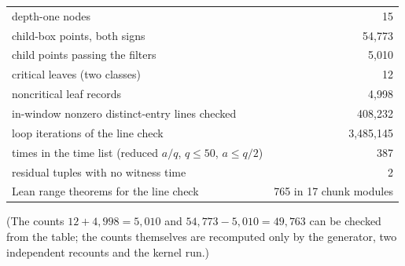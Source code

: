 \documentclass[11pt]{article}
\theoremstyle{remark}
\begin{document}
\begin{center}
\begin{tabular}{lr}
\toprule
depth-one nodes & 15\\
child-box points, both signs & 54{,}773\\
child points passing the filters & 5{,}010\\
critical leaves (two classes) & 12\\
noncritical leaf records & 4{,}998\\
in-window nonzero distinct-entry lines checked & 408{,}232\\
loop iterations of the line check & 3{,}485{,}145\\
times in the time list (reduced $a/q$, $q\le50$, $a\le q/2$) & 387\\
residual tuples with no witness time & 2\\
Lean range theorems for the line check & 765 in 17 chunk modules\\
\bottomrule
\end{tabular}
\end{center}
(The counts $12+4{,}998=5{,}010$ and $54{,}773-5{,}010=49{,}763$ can be checked from the table; the counts themselves are recomputed only by the generator, two independent recounts and the kernel run.)
\end{document}
